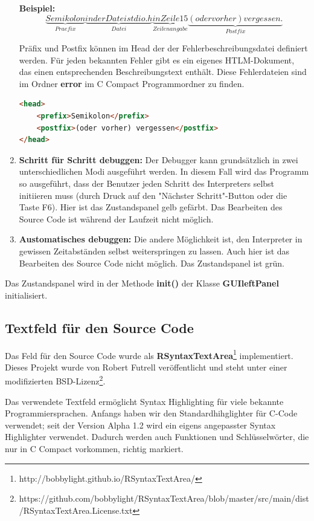 \begin{enumerate}
\textbf{Beispiel:}
\[
\underbrace{Semikolon}_{Praefix} \underbrace{in der Datei stdio.h}_{Datei} \underbrace{in Zeile 15}_{Zeilenangabe} \underbrace{(oder vorher) vergessen.}_{Postfix}
\]

Präfix und Postfix können im Head der der Fehlerbeschreibungsdatei definiert werden. Für jeden bekannten Fehler gibt es ein eigenes HTLM-Dokument, das einen entsprechenden Beschreibungstext enthält. Diese Fehlerdateien sind im Ordner \textbf{error} im C Compact Programmordner zu finden.

\begin{lstlisting}[language=HTML]
<head>
	<prefix>Semikolon</prefix>
	<postfix>(oder vorher) vergessen</postfix>
</head>
\end{lstlisting}

\item \textbf{Schritt für Schritt debuggen:} Der Debugger kann grundsätzlich in zwei unterschiedlichen Modi ausgeführt werden. In diesem Fall wird das Programm so ausgeführt, dass der Benutzer jeden Schritt des Interpreters selbst initiieren muss (durch Druck auf den "Nächster Schritt"-Button oder die Taste F6). Hier ist das Zustandspanel gelb gefärbt. Das Bearbeiten des Source Code ist während der Laufzeit nicht möglich.

\item \textbf{Austomatisches debuggen:} Die andere Möglichkeit ist, den Interpreter in gewissen Zeitabständen selbst weiterspringen zu lassen. Auch hier ist das Bearbeiten des Source Code nicht möglich. Das Zustandspanel ist grün.
\end{enumerate}

Das Zustandspanel wird in der Methode \textbf{init()} der Klasse \textbf{GUIleftPanel} initialisiert.

\subsection{Textfeld für den Source Code}
\label{sec:gui-main-left-code}
Das Feld für den Source Code wurde als \textbf{RSyntaxTextArea}\footnote{http://bobbylight.github.io/RSyntaxTextArea/} implementiert. Dieses Projekt wurde von Robert Futrell veröffentlicht und steht unter einer modifizierten BSD-Lizenz\footnote{https://github.com/bobbylight/RSyntaxTextArea/blob/master/src/main/dist/RSyntaxTextArea.License.txt}.

Das verwendete Textfeld ermöglicht Syntax Highlighting für viele bekannte Programmiersprachen. Anfangs haben wir den Standardhihglighter für C-Code verwendet; seit der Version Alpha 1.2 wird ein eigens angepasster Syntax Highlighter verwendet. Dadurch werden auch Funktionen und Schlüsselwörter, die nur in C Compact vorkommen, richtig markiert.

